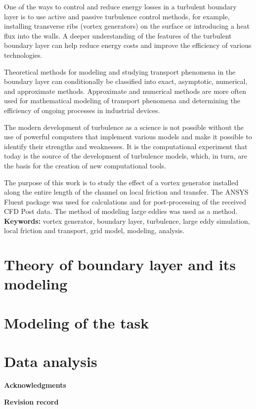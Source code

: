 \documentclass[12pt, a4paper]{article}
\begin{document}
	One of the ways to control and reduce energy losses in a turbulent boundary layer is to use active and passive turbulence control methods, for example, installing transverse ribs (vortex generators) on the surface or introducing a heat flux into the walls. A deeper understanding of the features of the turbulent boundary layer can help reduce energy costs and improve the efficiency of various technologies.
	
	Theoretical methods for modeling and studying transport phenomena in the boundary layer can conditionally be classified into exact, asymptotic, numerical, and approximate methods. Approximate and numerical methods are more often used for mathematical modeling of transport phenomena and determining the efficiency of ongoing processes in industrial devices.
	
	The modern development of turbulence as a science is not possible without the use of powerful computers that implement various models and make it possible to identify their strengths and weaknesses. It is the computational experiment that today is the source of the development of turbulence models, which, in turn, are the basis for the creation of new computational tools.
	
	The purpose of this work is to study the effect of a vortex generator installed along the entire length of the channel on local friction and transfer. The ANSYS Fluent package was used for calculations and for post-processing of the received CFD Post data. The method of modeling large eddies was used as a method.\\
	
	\textbf{Keywords:} vortex generator, boundary layer, turbulence, large eddy simulation, local friction and transport, grid model, modeling, analysis.\\	
	\newpage
	\section{Theory of boundary layer and its modeling}
	
	\newpage
	\section{Modeling of the task}
	
	\newpage
	\section{Data analysis}
	
	\newpage
	
	\newpage
	\printbibliography
	\newpage
	\begin{center}
		\Large\textbf{Acknowledgments}
	\end{center}
	\newpage
	\begin{center}
		\Large\textbf{Revision record}
	\end{center}
\end{document}
